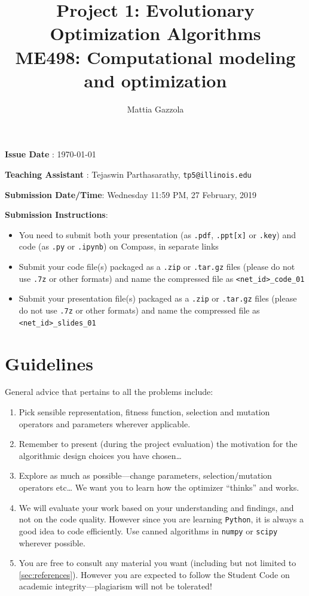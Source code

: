 \documentclass[11pt]{article}
\author{Mattia Gazzola}
\date{}
\title{Project 1: Evolutionary Optimization Algorithms\\\medskip
\large ME498: Computational modeling and optimization}
\begin{document}
\maketitle
\textbf{Issue Date} : \today

\textbf{Teaching Assistant} : Tejaswin Parthasarathy, \texttt{tp5@illinois.edu}

\textbf{Submission Date/Time}: Wednesday 11:59 PM, 27 February, 2019

\textbf{Submission Instructions}:
\begin{itemize}
\item You need to submit both your presentation (as \texttt{.pdf}, \texttt{.ppt[x]} or \texttt{.key}) and code
(as \texttt{.py} or \texttt{.ipynb}) on Compass, in separate links
\item Submit your code file(s) packaged as a \texttt{.zip} or \texttt{.tar.gz} files (please do not use
\texttt{.7z} or other formats) and name the compressed file as \texttt{<net\_id>\_code\_01}
\item Submit your presentation file(s) packaged as a \texttt{.zip} or \texttt{.tar.gz} files (please do not use
\texttt{.7z} or other formats) and name the compressed file as \texttt{<net\_id>\_slides\_01}
\end{itemize}

\section{Guidelines}
\label{sec:org731ba0d}
General advice that pertains to all the problems include:
\begin{enumerate}
\item Pick sensible representation, fitness function, selection and mutation
operators and parameters wherever applicable.
\item Remember to present (during the project evaluation) the motivation for the
algorithmic design choices you have chosen\ldots{}
\item Explore as much as possible---change parameters, selection/mutation
operators etc\ldots{} We want you to learn how the optimizer ``thinks'' and works.
\item We will evaluate your work based on your understanding and findings, and
not on the code quality. However since you are learning \texttt{Python}, it is
always a good idea to code efficiently. Use canned algorithms in \texttt{numpy} or
\texttt{scipy} wherever possible.
\item You are free to consult any material you want (including but not limited to
\cref{sec:references}). However you are expected to follow the Student Code
on academic integrity---plagiarism will not be tolerated!
\end{enumerate}
\end{document}
